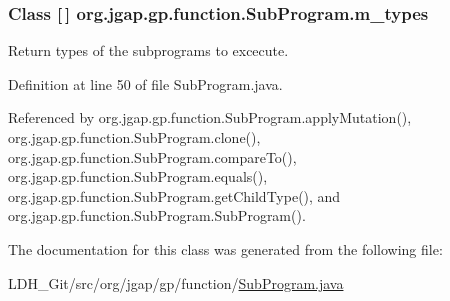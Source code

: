 \hypertarget{classorg_1_1jgap_1_1gp_1_1function_1_1_sub_program_af75004f996cfb4a825cc701c61047777}{
\subsubsection[{m\-\_\-types}]{\setlength{\rightskip}{0pt plus 5cm}Class \mbox{[}$\,$\mbox{]} org.\-jgap.\-gp.\-function.\-Sub\-Program.\-m\-\_\-types\hspace{0.3cm}{\ttfamily [private]}}}\label{classorg_1_1jgap_1_1gp_1_1function_1_1_sub_program_af75004f996cfb4a825cc701c61047777}
Return types of the subprograms to excecute. 

Definition at line 50 of file Sub\-Program.\-java.



Referenced by org.\-jgap.\-gp.\-function.\-Sub\-Program.\-apply\-Mutation(), org.\-jgap.\-gp.\-function.\-Sub\-Program.\-clone(), org.\-jgap.\-gp.\-function.\-Sub\-Program.\-compare\-To(), org.\-jgap.\-gp.\-function.\-Sub\-Program.\-equals(), org.\-jgap.\-gp.\-function.\-Sub\-Program.\-get\-Child\-Type(), and org.\-jgap.\-gp.\-function.\-Sub\-Program.\-Sub\-Program().



The documentation for this class was generated from the following file\-:\begin{DoxyCompactItemize}
\item 
L\-D\-H\-\_\-\-Git/src/org/jgap/gp/function/\hyperlink{_sub_program_8java}{Sub\-Program.\-java}\end{DoxyCompactItemize}
